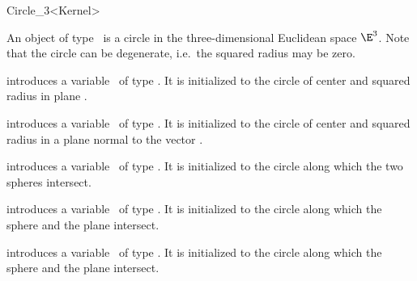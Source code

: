 \begin{ccRefClass}{Circle_3<Kernel>}

\ccDefinition

An object of type \ccRefName\ is a circle in the
three-dimensional Euclidean space $\E^3$. Note that the
circle can be degenerate, i.e.\ the squared radius may be zero.

\ccCreation
{}

\ccHidden
{}

	{introduces a variable \ccVar\ of type \ccClassTemplateName.
        It is initialized to the circle of center  and 
	squared radius  in plane .
	}

	{introduces a variable \ccVar\ of type \ccClassTemplateName.
        It is initialized to the circle of center  and 
	squared radius  in a plane normal to
	the vector .
	}

	{introduces a variable \ccVar\ of type \ccClassTemplateName.
        It is initialized to the circle along which the two spheres intersect.
	}

	{introduces a variable \ccVar\ of type \ccClassTemplateName.
        It is initialized to the circle along which the sphere and the 
	plane intersect.
	}

	{introduces a variable \ccVar\ of type \ccClassTemplateName.
        It is initialized to the circle along which the sphere and the 
	plane intersect.
	}


\end{ccRefClass}
